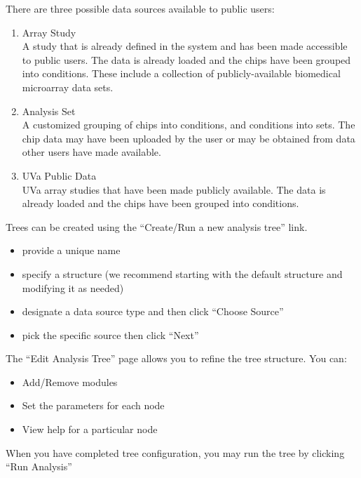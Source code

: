 \documentclass{compactslide} %
\begin{document}
\begin{slide}

There are three possible data sources available to public users:
\begin{enumerate}
\item Array Study \\
A study that is already defined in the system and has been made
accessible to public users.  The data is already loaded and the chips
have been grouped into conditions.  These include a collection of
publicly-available biomedical microarray data sets.
\item Analysis Set \\
A customized grouping of chips into conditions, and conditions into
sets.  The chip data may have been uploaded by the user or may be
obtained from data other users have made available.
\item UVa Public Data \\
UVa array studies that have been made publicly available.  The data is
already loaded and the chips have been grouped into conditions.
\end{enumerate}
\end{slide}

\begin{slide}

Trees can be created using the ``Create/Run a new analysis tree'' link.
\begin{itemize}
\item provide a unique name
\item specify a structure (we recommend starting with the default
structure and modifying it as needed)
\item designate a data source type and then click ``Choose Source''
\item pick the specific source then click ``Next''
\end{itemize}
\end{slide}

\begin{slide}

The ``Edit Analysis Tree'' page allows you to refine the tree structure.
You can:
\begin{itemize}
\item Add/Remove modules
\item Set the parameters for each node
\item View help for a particular node
\end{itemize}

When you have completed tree configuration, you may run the tree by
clicking ``Run Analysis''
\end{slide}
\end{document}
